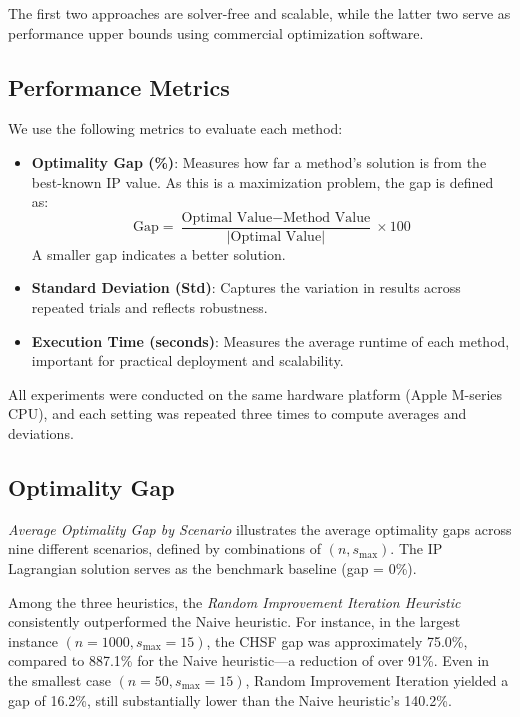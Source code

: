 The first two approaches are solver-free and scalable, while the latter two serve as performance upper bounds using commercial optimization software.

\subsection{Performance Metrics}

We use the following metrics to evaluate each method:

\begin{itemize}
    \item \textbf{Optimality Gap (\%)}: Measures how far a method's solution is from the best-known IP value. As this is a maximization problem, the gap is defined as:
    \[
    \text{Gap} = \frac{\text{Optimal Value} - \text{Method Value}}{|\text{Optimal Value}|} \times 100
    \]
    A smaller gap indicates a better solution.
    
    \item \textbf{Standard Deviation (Std)}: Captures the variation in results across repeated trials and reflects robustness.
    
    \item \textbf{Execution Time (seconds)}: Measures the average runtime of each method, important for practical deployment and scalability.
\end{itemize}

All experiments were conducted on the same hardware platform (Apple M-series CPU), and each setting was repeated three times to compute averages and deviations.

\subsection{Optimality Gap}

\emph{Average Optimality Gap by Scenario} illustrates the average optimality gaps across nine different scenarios, defined by combinations of $(n, s_{\max})$. The IP Lagrangian solution serves as the benchmark baseline (gap = 0\%).

Among the three heuristics, the \emph{Random Improvement Iteration Heuristic} consistently outperformed the Naive heuristic. For instance, in the largest instance $(n=1000, s_{\max}=15)$, the CHSF gap was approximately 75.0\%, compared to 887.1\% for the Naive heuristic—a reduction of over 91\%. Even in the smallest case $(n=50, s_{\max}=15)$, Random Improvement Iteration yielded a gap of 16.2\%, still substantially lower than the Naive heuristic's 140.2\%.

